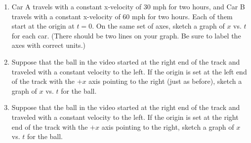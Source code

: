 \begin{description}
\begin{enumerate}
 \item Car A travels with a constant x-velocity of 30 mph for two hours, and Car B travels with a constant x-velocity of 60 mph for two hours. Each of them start at the origin at $t=0$. On the same set of axes, sketch a graph of $x$ vs. $t$ for each car. (There should be two lines on your graph. Be sure to label the axes with correct units.)
 \item Suppose that the ball in the video started at the right end of the track and traveled with a constant velocity to the left. If the origin is set at the left end of the track with the $+x$ axis pointing to the right (just as before), sketch a graph of $x$ vs. $t$ for the ball.
 \item Suppose that the ball in the video started at the right end of the track and traveled with a constant velocity to the left. If the origin is set at the right end of the track with the $+x$ axis pointing to the right, sketch a graph of $x$ vs. $t$ for the ball.
\end{enumerate}
\end{description}









